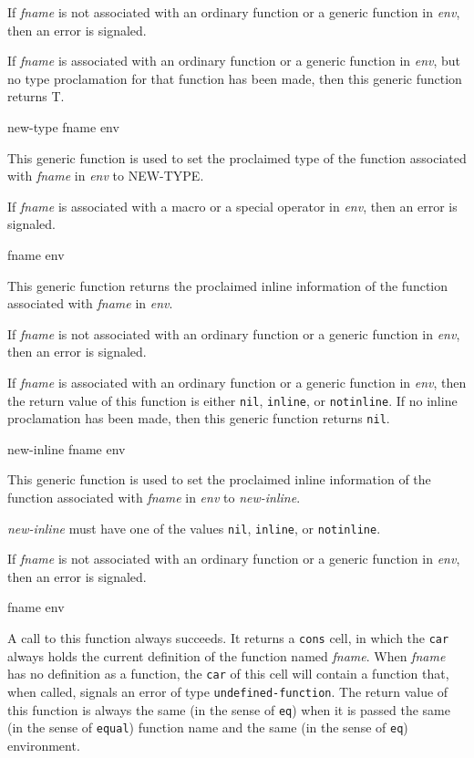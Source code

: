 If \textit{fname} is not associated with an ordinary function or a
generic function in \textit{env}, then an error is signaled.

If \textit{fname} is associated with an ordinary function or a
generic function in \textit{env}, but no type proclamation for that
function has been made, then this generic function returns T.

 {new-type fname env}

This generic function is used to set the proclaimed type of the
function associated with \textit{fname} in \textit{env} to NEW-TYPE.

If \textit{fname} is associated with a macro or a special operator
in \textit{env}, then an error is signaled.

 {fname env}

This generic function returns the proclaimed inline information of
the function associated with \textit{fname} in \textit{env}.

If \textit{fname} is not associated with an ordinary function or a
generic function in \textit{env}, then an error is signaled.

If \textit{fname} is associated with an ordinary function or a
generic function in \textit{env}, then the return value of this
function is either \texttt{nil}, \texttt{inline}, or \texttt{notinline}.  If no inline
proclamation has been made, then this generic function returns
\texttt{nil}.

 {new-inline fname env}

This generic function is used to set the proclaimed inline
information of the function associated with \textit{fname} in
\textit{env} to \textit{new-inline}.

\textit{new-inline} must have one of the values \texttt{nil}, \texttt{inline}, or
\texttt{notinline}.

If \textit{fname} is not associated with an ordinary function or a
generic function in \textit{env}, then an error is signaled.

 {fname env}

A call to this function always succeeds.  It returns a \texttt{cons} cell,
in which the \texttt{car} always holds the current definition of the
function named \textit{fname}.  When \textit{fname} has no
definition as a function, the \texttt{car} of this cell will contain a
function that, when called, signals an error of type
\texttt{undefined-function}.  The return value of this function is always
the same (in the sense of \texttt{eq}) when it is passed the same (in the
sense of \texttt{equal}) function name and the same (in the sense of \texttt{eq})
environment.

